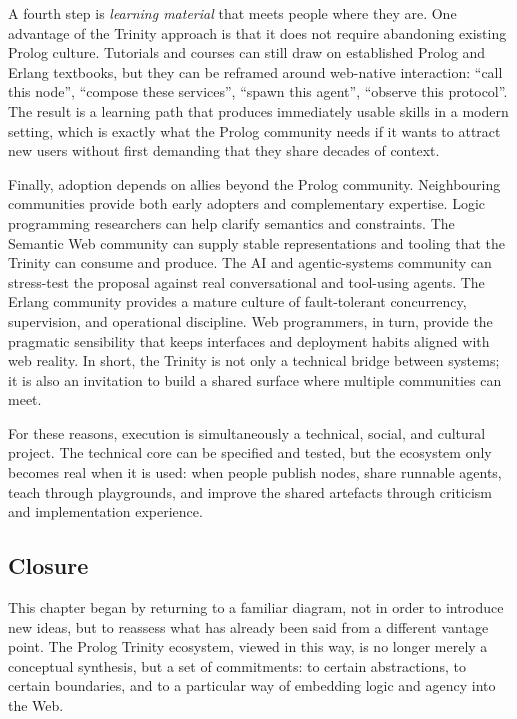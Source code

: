 A fourth step is \emph{learning material} that meets people where they are. One advantage of the Trinity approach is that it does not require abandoning existing Prolog culture. Tutorials and courses can still draw on established Prolog and Erlang textbooks, but they can be reframed around web-native interaction: ``call this node'', ``compose these services'', ``spawn this agent'', ``observe this protocol''. The result is a learning path that produces immediately usable skills in a modern setting, which is exactly what the Prolog community needs if it wants to attract new users without first demanding that they share decades of context.

Finally, adoption depends on allies beyond the Prolog community. Neighbouring communities provide both early adopters and complementary expertise. Logic programming researchers can help clarify semantics and constraints. The Semantic Web community can supply stable representations and tooling that the Trinity can consume and produce. The AI and agentic-systems community can stress-test the proposal against real conversational and tool-using agents. The Erlang community provides a mature culture of fault-tolerant concurrency, supervision, and operational discipline. Web programmers, in turn, provide the pragmatic sensibility that keeps interfaces and deployment habits aligned with web reality. In short, the Trinity is not only a technical bridge between systems; it is also an invitation to build a shared surface where multiple communities can meet.

For these reasons, execution is simultaneously a technical, social, and cultural project. The technical core can be specified and tested, but the ecosystem only becomes real when it is used: when people publish nodes, share runnable agents, teach through playgrounds, and improve the shared artefacts through criticism and implementation experience.

\subsection{Closure}\label{sec:execution-closure}

This chapter began by returning to a familiar diagram, not in order to introduce new ideas, but to reassess what has already been said from a different vantage point. The Prolog Trinity ecosystem, viewed in this way, is no longer merely a conceptual synthesis, but a set of commitments: to certain abstractions, to certain boundaries, and to a particular way of embedding logic and agency into the Web.

